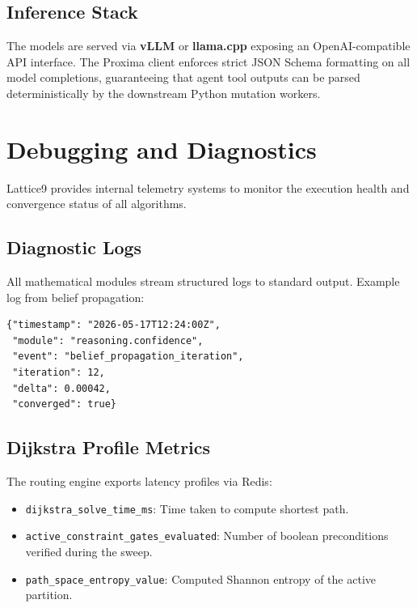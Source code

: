 \documentclass[11pt,a4paper]{article}
\theoremstyle{definition}
\numberwithin{equation}{section}
\begin{document}
\subsection{Inference Stack}\label{subsec:inference}

The models are served via \textbf{vLLM} or \textbf{llama.cpp} exposing an OpenAI-compatible API interface. The Proxima client enforces strict JSON Schema formatting on all model completions, guaranteeing that agent tool outputs can be parsed deterministically by the downstream Python mutation workers.

\section{Debugging and Diagnostics}\label{sec:debugging}

Lattice9 provides internal telemetry systems to monitor the execution health and convergence status of all algorithms.

\subsection{Diagnostic Logs}\label{subsec:diagnostics}

All mathematical modules stream structured logs to standard output. Example log from belief propagation:

\begin{lstlisting}[style=latticecode]
{"timestamp": "2026-05-17T12:24:00Z",
 "module": "reasoning.confidence",
 "event": "belief_propagation_iteration",
 "iteration": 12,
 "delta": 0.00042,
 "converged": true}
\end{lstlisting}

\subsection{Dijkstra Profile Metrics}\label{subsec:profiling}

The routing engine exports latency profiles via Redis:
\begin{itemize}[leftmargin=2em]
    \item \texttt{dijkstra\_solve\_time\_ms}: Time taken to compute shortest path.
    \item \texttt{active\_constraint\_gates\_evaluated}: Number of boolean preconditions verified during the sweep.
    \item \texttt{path\_space\_entropy\_value}: Computed Shannon entropy of the active partition.
\end{itemize}
\end{document}
